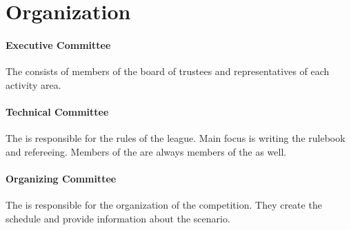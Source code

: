 \section{Organization}
\label{sec:introduction:organization}

\paragraph{Executive Committee}
\label{sec:introduction:ec}
The \EC{} consists of members of the board of trustees and representatives of each activity area.

\paragraph{Technical Committee}
\label{sec:introduction:tc}
The \TC{} is responsible for the rules of the league. Main focus is writing the rulebook and refereeing.
Members of the \EC{} are always members of the \TC{} as well.

\paragraph{Organizing Committee}
\label{sec:introduction:oc}
The \OC{} is responsible for the organization of the competition. They create the schedule and provide information about the scenario.
